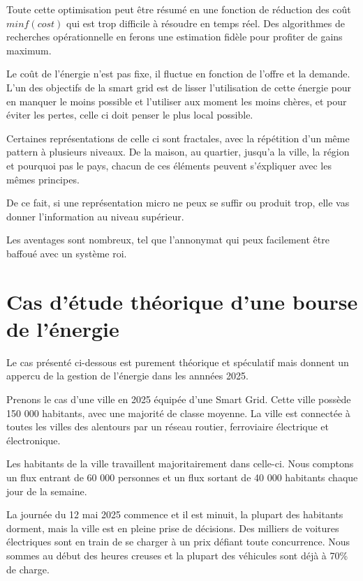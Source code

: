 Toute cette optimisation peut être résumé en une fonction de réduction des coût $min f(cost)$ qui est trop difficile
à résoudre en temps réel. Des algorithmes de recherches opérationnelle en ferons une estimation fidèle
pour profiter de gains maximum.


Le coût de l'énergie n'est pas fixe, il fluctue en fonction de l'offre et la demande.
L'un des objectifs de la smart grid est de lisser l'utilisation de cette énergie pour
en manquer le moins possible et l'utiliser aux moment les moins chères, et pour éviter les pertes,
celle ci doit penser le plus local possible.

Certaines représentations de celle ci sont fractales, avec la répétition d'un même pattern à
plusieurs niveaux.
De la maison, au quartier, jusqu'a la ville, la région et pourquoi pas le pays, chacun de
ces éléments peuvent s'éxpliquer avec les mêmes principes.

De ce fait, si une représentation micro ne peux se suffir ou produit trop, elle vas donner l'information
au niveau supérieur.

Les aventages sont nombreux, tel que l'annonymat qui peux facilement être baffoué avec un système roi.

\section{Cas d'étude théorique d'une bourse de l'énergie}

Le cas présenté ci-dessous est purement théorique et spéculatif mais donnent un appercu de
la gestion de l'énergie dans les annnées 2025.

Prenons le cas d'une ville en 2025 équipée d'une Smart Grid.
Cette ville possède 150 000 habitants, avec une majorité de classe moyenne.
La ville est connectée à toutes les villes des alentours par un réseau routier, ferroviaire
électrique et électronique.

Les habitants de la ville travaillent majoritairement dans celle-ci.
Nous comptons un flux entrant de 60 000 personnes et un flux sortant de 40 000 habitants chaque jour
de la semaine.

La journée du 12 mai 2025 commence et il est minuit, la plupart des habitants dorment, mais
la ville est en pleine prise de décisions.
Des milliers de voitures électriques sont en train de se charger à un prix défiant toute concurrence.
Nous sommes au début des heures creuses et la plupart des véhicules sont déjà à 70\% de charge.

